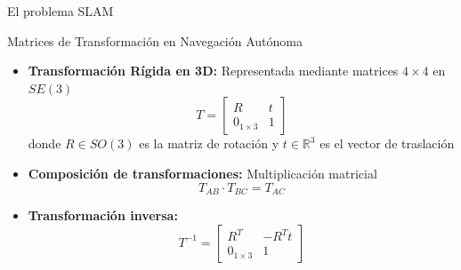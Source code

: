 \documentclass[10pt]{beamer}
\begin{document}
\begin{frame}{El problema SLAM}
\begin{center}
            \end{center}
        \end{frame}
        
        \begin{frame}{Matrices de Transformación en Navegación Autónoma}
            \begin{itemize}
                \item \textbf{Transformación Rígida en 3D:} Representada mediante matrices $4 \times 4$ en $SE(3)$
                \begin{equation*}
                T = \begin{bmatrix} 
                R & t \\
                0_{1 \times 3} & 1
                \end{bmatrix}
                \end{equation*}
                donde $R \in SO(3)$ es la matriz de rotación y $t \in \mathbb{R}^3$ es el vector de traslación
                
                \item \textbf{Composición de transformaciones:} Multiplicación matricial
                \begin{equation*}
                T_{AB} \cdot T_{BC} = T_{AC}
                \end{equation*}
                
                \item \textbf{Transformación inversa:}
                \begin{equation*}
                T^{-1} = \begin{bmatrix} 
                R^T & -R^Tt \\
                0_{1 \times 3} & 1
                \end{bmatrix}
                \end{equation*}
            \end{itemize}
            
            \begin{center}
                \begin{tikzpicture}[scale=0.7]


\end{tikzpicture}
\end{center}
\end{frame}
\end{document}
